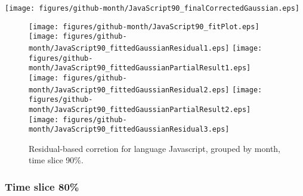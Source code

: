 \begin{center}
{\texttt{[image: figures/github-month/JavaScript90\_finalCorrectedGaussian.eps]}}
\end{center}

\FloatBarrier

\begin{figure}[t]
\centering
{}
{\texttt{[image: figures/github-month/JavaScript90\_fitPlot.eps]}}
{\texttt{[image: figures/github-month/JavaScript90\_fittedGaussianResidual1.eps]}}
{\texttt{[image: figures/github-month/JavaScript90\_fittedGaussianPartialResult1.eps]}}
{\texttt{[image: figures/github-month/JavaScript90\_fittedGaussianResidual2.eps]}}
{\texttt{[image: figures/github-month/JavaScript90\_fittedGaussianPartialResult2.eps]}}
{\texttt{[image: figures/github-month/JavaScript90\_fittedGaussianResidual3.eps]}}
\caption{Residual-based corretion for language Javascript, grouped by month, time slice 90\%.}
\end{figure}


\FloatBarrier


\subsubsection{Time slice 80\%}

